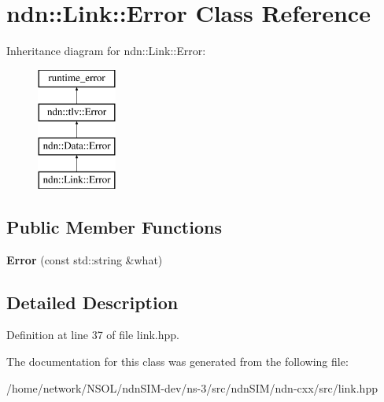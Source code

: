 \hypertarget{classndn_1_1Link_1_1Error}{}\section{ndn\+:\+:Link\+:\+:Error Class Reference}
\label{classndn_1_1Link_1_1Error}
Inheritance diagram for ndn\+:\+:Link\+:\+:Error\+:\begin{figure}[H]
\begin{center}
\leavevmode
\includegraphics[height=4.000000cm]{classndn_1_1Link_1_1Error}
\end{center}
\end{figure}
\subsection*{Public Member Functions}
\begin{DoxyCompactItemize}
\item 
{\bfseries Error} (const std\+::string \&what)\hypertarget{classndn_1_1Link_1_1Error_aee375c7b00fddeda2beed4202edadcdb}{}\label{classndn_1_1Link_1_1Error_aee375c7b00fddeda2beed4202edadcdb}

\end{DoxyCompactItemize}


\subsection{Detailed Description}


Definition at line 37 of file link.\+hpp.



The documentation for this class was generated from the following file\+:\begin{DoxyCompactItemize}
\item 
/home/network/\+N\+S\+O\+L/ndn\+S\+I\+M-\/dev/ns-\/3/src/ndn\+S\+I\+M/ndn-\/cxx/src/link.\+hpp\end{DoxyCompactItemize}
